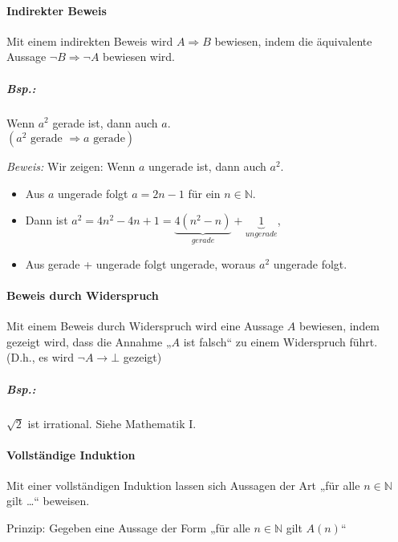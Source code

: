 \paragraph{Indirekter Beweis} Mit einem indirekten Beweis wird $A\Rightarrow B$ bewiesen, indem die äquivalente Aussage $\neg B \Rightarrow \neg A$ bewiesen wird.

\subparagraph{Bsp.:} Wenn $a^2$ gerade ist, dann auch $a$.\\
$(a^2 \text{ gerade } \Rightarrow a \text{ gerade})$

\emph{Beweis:} Wir zeigen: Wenn $a$ ungerade ist, dann auch $a^2$.
\begin{itemize}
\item Aus $a$ ungerade folgt $a=2n-1$ für ein $n \in \mathbb{N}$. 
\item Dann ist $a^2=4 n^2 - 4 n + 1 = \underbrace{4( n^2-n)}_{gerade} + \underbrace{1}_{ungerade}$, 
\item Aus gerade + ungerade folgt ungerade, woraus $a^2$ ungerade folgt.
\end{itemize}

\paragraph{Beweis durch Widerspruch} Mit einem Beweis durch Widerspruch wird eine Aussage $A$ bewiesen, indem gezeigt wird, dass die Annahme „$A$ ist falsch“ zu einem Widerspruch führt.\\
(D.h., es wird $\neg A \rightarrow \bot$ gezeigt)

\subparagraph{Bsp.:} $\sqrt{2}$ ist irrational. Siehe Mathematik I.

\paragraph{Vollständige Induktion} Mit einer vollständigen Induktion lassen sich Aussagen der Art „für alle $n \in \mathbb{N}$ gilt …“ beweisen.

Prinzip: Gegeben eine Aussage der Form „für alle $n \in \mathbb{N}$ gilt $A(n)$“

